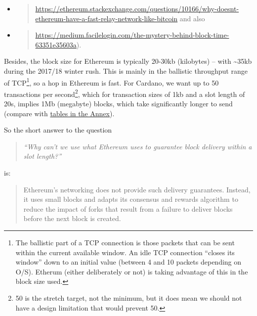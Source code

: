 \documentclass[]{article}
\begin{document}
\begin{itemize}
\item
  \begin{quote}
  \href{https://ethereum.stackexchange.com/questions/10166/why-doesnt-ethereum-have-a-fast-relay-network-like-bitcoin}{{https://ethereum.stackexchange.com/questions/10166/why-doesnt-ethereum-have-a-fast-relay-network-like-bitcoin}}
  and also
  \end{quote}
\item
  \begin{quote}
  \href{https://medium.facilelogin.com/the-mystery-behind-block-time-63351e35603a}{{https://medium.facilelogin.com/the-mystery-behind-block-time-63351e35603a}}).
  \end{quote}
\end{itemize}

Besides, the block size for Ethereum is typically 20-30kb (kilobytes) --
with \textasciitilde{}35kb during the 2017/18 winter rush. This is
mainly in the ballistic throughput range of TCP\footnote{The ballistic
  part of a TCP connection is those packets that can be sent within the
  current available window. An idle TCP connection ``closes its window''
  down to an initial value (between 4 and 10 packets depending on O/S).
  Etherum (either deliberately or not) is taking advantage of this in
  the block size used.}, so a hop in Ethereum is fast. For Cardano, we
want up to 50 transactions per second\footnote{50 is the stretch target,
  not the minimum, but it does mean we should not have a design
  limitation that would prevent 50.}, which for transaction sizes of 1kb
and a slot length of 20s, implies 1Mb (megabyte) blocks, which take
significantly longer to send (compare with
\protect\hyperlink{tcp-rpc-response-behavior}{{tables in the Annex}}).

So the short answer to the question

\begin{quote}
\emph{``Why can't we use what Ethereum uses to guarantee block delivery
within a slot length?'' }
\end{quote}

is:

\begin{quote}
Ethereum's networking does not provide such delivery guarantees.
Instead, it uses small blocks and adapts its consensus and rewards
algorithm to reduce the impact of forks that result from a failure to
deliver blocks before the next block is created.
\end{quote}
\end{document}

